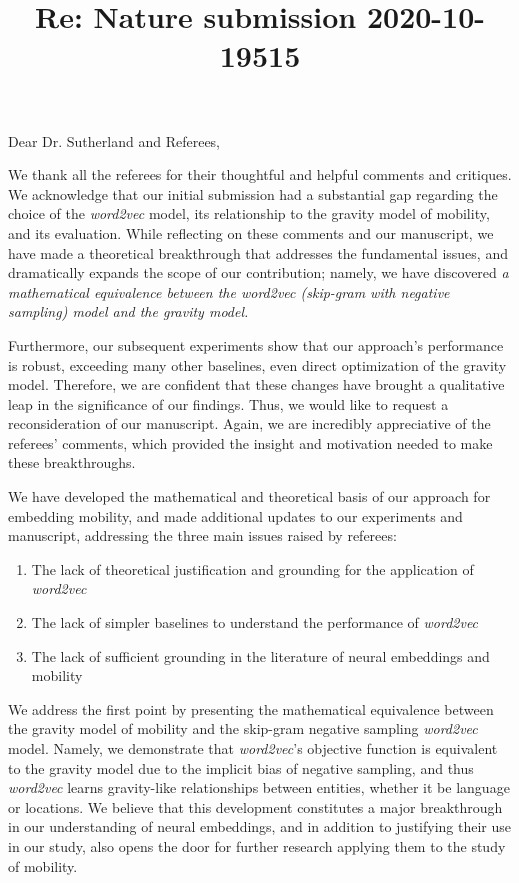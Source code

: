 \documentclass[12pt,draft,a4paper]{article}
\title{Re: Nature submission 2020-10-19515}
\date{}
\makeatletter
\newcounter{comment}[subsection]
\renewcommand{\maketitle}{\bgroup\setlength{\parindent}{0pt}
\begin{flushleft}
\Large  \textbf{\@title}
\end{flushleft}\egroup
}
\makeatother
\begin{document}
\maketitle

\bigskip
\thispagestyle{empty}
\vspace{-0.4cm}
\noindent Dear Dr. Sutherland and Referees,\\
\vspace{-0.25cm}

We thank all the referees for their thoughtful and helpful comments and critiques.
We acknowledge that our initial submission had a substantial gap regarding the choice of the \textit{word2vec} model, its relationship to the gravity model of mobility, and its evaluation.
While reflecting on these comments and our manuscript, we have made a theoretical breakthrough that addresses the fundamental issues, and dramatically expands the scope of our contribution;
namely, we have discovered \emph{a mathematical equivalence between the \textit{word2vec} (skip-gram with negative sampling) model and the gravity model.}

Furthermore, our subsequent experiments show that our approach's performance is robust, exceeding many other baselines, even direct optimization of the gravity model.
Therefore, we are confident that these changes have brought a qualitative leap in the significance of our findings.
Thus, we would like to request a reconsideration of our manuscript.
Again, we are incredibly appreciative of the referees' comments, which provided the insight and motivation needed to make these breakthroughs.

We have developed the mathematical and theoretical basis of our approach for embedding mobility, and made additional updates to our experiments and manuscript, addressing the three main issues raised by referees:
\vspace{-0.1cm}
\begin{enumerate}
	\itemsep0em
	\item The lack of theoretical justification and grounding for the application of \textit{word2vec}
	\item The lack of simpler baselines to understand the performance of \textit{word2vec}
	\item The lack of sufficient grounding in the literature of neural embeddings and mobility
\end{enumerate}
\vspace{-0.1cm}
We address the first point by presenting the mathematical equivalence between the gravity model of mobility and the skip-gram negative sampling \textit{word2vec} model.
Namely, we demonstrate that \textit{word2vec}'s objective function is equivalent to the gravity model due to the implicit bias of negative sampling,  and thus \textit{word2vec} learns gravity-like relationships between entities, whether it be language or locations.
We believe that this development constitutes a major breakthrough in our understanding of neural embeddings, and in addition to justifying their use in our study, also opens the door for further research applying them to the study of mobility.
\end{document}
